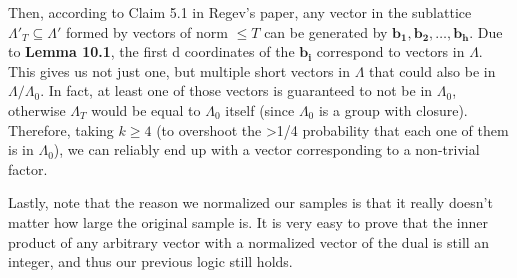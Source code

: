 Then, according to Claim 5.1 in Regev's paper, any vector in the sublattice $\mathit \Lambda'_T \subseteq \mathit \Lambda'$ formed by vectors of norm $\leq T$ can be generated by $\mathbf{b_1}, \mathbf{b_2}, \dots ,\mathbf{b_h}$. 
Due to \textbf{Lemma 10.1}, the first d coordinates of the $\mathbf{b_i}$ correspond to vectors in $\mathit \Lambda$. This gives us not just one, but multiple short vectors in $\mathit \Lambda$ that could also be in $\mathit \Lambda / \mathit \Lambda_0$. In fact, at least one of those vectors is guaranteed to not be in $\mathit \Lambda_0$, otherwise $\mathit \Lambda_T$  would be equal to $\mathit \Lambda_0$ itself (since $\mathit \Lambda_0$ is a group with closure). Therefore, taking $k \geq 4$ (to overshoot the >1/4 probability that each one of them is in $\mathit \Lambda_0$), we can reliably end up with a vector corresponding to a non-trivial factor.

Lastly, note that the reason we normalized our samples is that it really doesn't matter how large the original sample is. It is very easy to prove that the inner product of any arbitrary vector with a normalized vector of the dual is still an integer, and thus our previous logic still holds.











